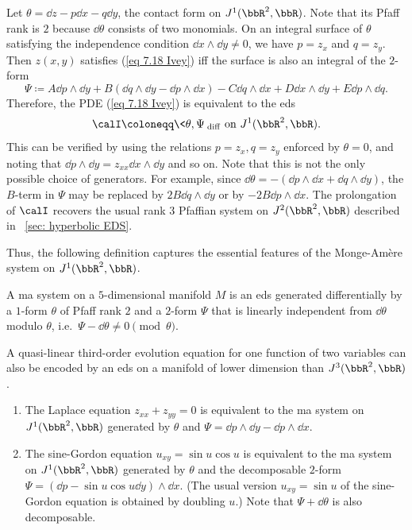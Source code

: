 Let $\theta=\dd z-p\dd x-q\dd y$, the contact form on $J^1(\bbR^2,\bbR)$. Note that its Pfaff rank is $2$ because $\dd\theta$ consists of two monomials. On an integral surface of $\theta$ satisfying the independence condition $\dd x\wedge\dd y\neq 0$, we have $p=z_x$ and $q=z_y$. Then $z(x,y)$ satisfies (\ref{eq 7.18 Ivey}) iff the surface is also an integral of the $2$-form 
\[
    \Psi\coloneqq A\dd p\wedge \dd y+B(\dd q\wedge \dd y-\dd p\wedge \dd x)-C\dd q\wedge \dd x+D\dd x\wedge\dd y+E\dd p\wedge \dd q.\label{eq 7.19 Ivey}
\]
Therefore, the PDE (\ref{eq 7.18 Ivey}) is equivalent to the \gls{eds} 
\[\calI\coloneqq \<\theta,\Psi\>_{\mathrm{diff}} \text{ on }J^1(\bbR^2,\bbR).\]
This can be verified by using the relations $p=z_x,q=z_y$ enforced by $\theta=0$, and noting that $\dd p\wedge\dd y=z_{xx}\dd x\wedge \dd y$ and so on. Note that this is not the only possible choice of generators. For example, since $\dd\theta=-(\dd p\wedge\dd x+\dd q\wedge \dd y)$, the $B$-term in $\Psi$ may be replaced by $2B\dd q\wedge \dd y$ or by $-2B\dd p\wedge \dd x$. The prolongation of $\calI$ recovers the usual rank $3$ Pfaffian system on $J^2(\bbR^2,\bbR)$ described in \subsect~\ref{sec: hyperbolic EDS}.

Thus, the following definition captures the essential features of the Monge-Am\`ere system on $J^1(\bbR^2,\bbR)$.

\begin{defn}
    A \gls{ma} system on a $5$-dimensional manifold $M$ is an \gls{eds} generated differentially by a $1$-form $\theta$ of Pfaff rank $2$ and a $2$-form $\Psi$ that is linearly independent from $\dd\theta$ modulo $\theta$, i.e.\ $\Psi-\dd\theta\neq 0\pmod{\theta}$.
\end{defn}

\begin{rem}
    A quasi-linear third-order evolution equation for one function of two variables can also be encoded by an \gls{eds} on a manifold of lower dimension than $J^3(\bbR^2,\bbR)$.
\end{rem}

\begin{example}
    \begin{enumerate}
        \item The Laplace equation $z_{xx}+z_{yy}=0$ is equivalent to the \gls{ma} system on $J^1(\bbR^2,\bbR)$ generated by $\theta$ and $\Psi=\dd p\wedge\dd y-\dd p\wedge \dd x$.
        \item The sine-Gordon equation $u_{xy}=\sin u\cos u$ is equivalent to the \gls{ma} system on $J^1(\bbR^2,\bbR)$ generated by $\theta$ and the decomposable $2$-form $\Psi=(\dd p-\sin u \cos u\dd y)\wedge\dd x$. (The usual version $u_{xy}=\sin u$ of the sine-Gordon equation is obtained by doubling $u$.) Note that $\Psi+\dd\theta$ is also decomposable.
    \end{enumerate}
\end{example}


